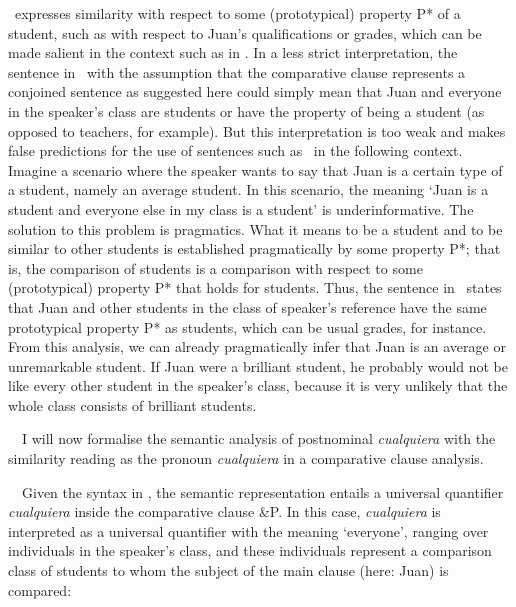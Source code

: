 \begin{styleStandard}
\ expresses similarity with respect to some (prototypical) property P* of a student, such as with respect to Juan’s qualifications or grades, which can be made salient in the context such as in . In a less strict interpretation, the sentence in \ with the assumption that the comparative clause represents a conjoined sentence as suggested here could simply mean that Juan and everyone in the speaker’s class are students or have the property of being a student (as opposed to teachers, for example). But this interpretation is too weak and makes false predictions for the use of sentences such as \ in the following context. Imagine a scenario where the speaker wants to say that Juan is a certain type of a student, namely an average student. In this scenario, the meaning ‘Juan is a student and everyone else in my class is a student’ is underinformative. The solution to this problem is pragmatics. What it means to be a student and to be similar to other students is established pragmatically by some property P*; that is, the comparison of students is a comparison with respect to some (prototypical) property P* that holds for students. Thus, the sentence in \ states that Juan and other students in the class of speaker’s reference have the same prototypical property P* as students, which can be usual grades, for instance. From this analysis, we can already pragmatically infer that Juan is an average or unremarkable student. If Juan were a brilliant student, he probably would not be like every other student in the speaker’s class, because it is very unlikely that the whole class consists of brilliant students. 
\end{styleStandard}

\begin{styleStandard}
\ \ I will now formalise the semantic analysis of postnominal \textit{cualquiera} with the similarity reading as the pronoun \textit{cualquiera} in a comparative clause analysis.
\end{styleStandard}

\begin{styleStandard}
\ \ Given the syntax in , the semantic representation entails a universal quantifier \textit{cualquiera} inside the comparative clause \&P. In this case, \textit{cualquiera} is interpreted as a universal quantifier with the meaning ‘everyone’, ranging over individuals in the speaker’s class, and these individuals represent a comparison class of students to whom the subject of the main clause (here: Juan) is compared:
\end{styleStandard}

